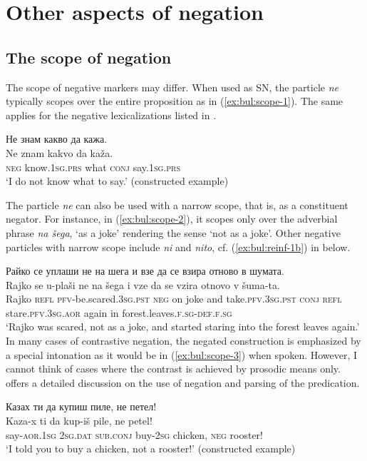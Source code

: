 \documentclass[output=paper,colorlinks=true, citecolor=brown]{langscibook}
\begin{document}
\section{Other aspects of negation}

\subsection{The scope of negation} \label{sec:bul:scope}
The scope of negative markers may differ. When used as SN, the particle \textit{ne} typically scopes over the entire proposition as in (\ref{ex:bul:scope-1}). The same applies for the negative lexicalizations listed in .

\ea Не знам какво да кажа.\label{ex:bul:scope-1}\\ 
  	\gll Ne znam kakvo da kaža.\\
      \textsc{neg} know.\textsc{1sg.prs} what \textsc{conj} say.\textsc{1sg.prs}\\
\glt `I do not know what to say.' (constructed example)
\z

The particle \textit{ne} can also be used with a narrow scope, that is, as a constituent negator. For instance, in (\ref{ex:bul:scope-2}), it scopes only over the adverbial phrase \textit{na šega}, `as a joke' rendering the sense `not as a joke'. Other negative particles with narrow scope include \textit{ni} and \textit{nito}, cf. (\ref{ex:bul:reinf-1b}) in  below.

\ea Райко се уплаши не на шега и взе да се взира отново в шумата.\label{ex:bul:scope-2}\\ 
  	\gll Rajko se u-plaši ne na šega i vze da se vzira otnovo v šuma-ta.\\
     Rajko \textsc{refl} \textsc{pfv}-be.scared.\textsc{3sg.pst} \textsc{neg} on joke and take.\textsc{pfv.3sg.pst} \textsc{conj} \textsc{refl} stare.\textsc{pfv.3sg.aor} again in forest.leaves.\textsc{f.sg}-\textsc{def.f.sg}\\
\glt `Rajko was scared, not as a joke, and started staring into the forest leaves again.' \citet[492]{StojanovEtAl1983} 
\z
In many cases of contrastive negation, the negated construction is emphasized by a special intonation as it would be in (\ref{ex:bul:scope-3}) when spoken. However, I cannot think of cases where the contrast is achieved by prosodic means only. \citet{Lashkova1980} offers a detailed discussion on the use of negation and parsing of the predication.

\ea Казах ти да купиш пиле, не петел!\label{ex:bul:scope-3}\\ 
  	\gll Kaza-x ti da kup-iš pile, ne petel!\\
      say-\textsc{aor.1sg} \textsc{2sg.dat} \textsc{sub.conj} buy-2\textsc{sg} chicken, \textsc{neg} rooster!\\
\glt `I told you to buy a chicken, not a rooster!' (constructed example)
\z
\end{document}
